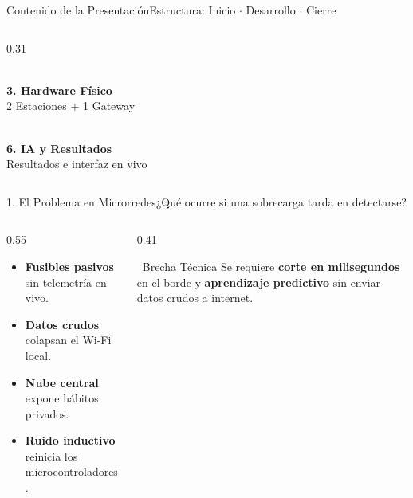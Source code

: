 \documentclass[aspectratio=169,11pt,xcolor=table]{beamer}
\begin{document}
\begin{frame}{Contenido de la Presentación}{Estructura: Inicio $\cdot$ Desarrollo $\cdot$ Cierre}
\begin{columns}[T,onlytextwidth]
    \begin{column}{0.31\textwidth}
      \begin{tcolorbox}[colback=brandamber!12,colframe=brandamber!50,boxrule=0.7pt,arc=4pt,halign=center,top=4pt,bottom=4pt,boxsep=1pt]
        {\large\color{brandamber}\faServer}\\[2pt]
        {\small\bfseries 3. Hardware Físico}\\[1pt]
        {\scriptsize 2 Estaciones + 1 Gateway}
      \end{tcolorbox}
      \vspace{0.12cm}
      \begin{tcolorbox}[colback=brandblue!10,colframe=brandblue!40,boxrule=0.7pt,arc=4pt,halign=center,top=4pt,bottom=4pt,boxsep=1pt]
        {\large\color{brandblue}\faBrain}\\[2pt]
        {\small\bfseries 6. IA y Resultados}\\[1pt]
        {\scriptsize Resultados e interfaz en vivo}
      \end{tcolorbox}
    \end{column}
  \end{columns}
\end{frame}

\begin{frame}{1. El Problema en Microrredes}{¿Qué ocurre si una sobrecarga tarda en detectarse?}
  \vspace{0.15cm}
  \begin{columns}[c,onlytextwidth]
    \begin{column}{0.55\textwidth}
      \normalsize
      \begin{itemize}\setlength{\itemsep}{10pt}
        \item \textbf{Fusibles pasivos} sin telemetría en vivo.
        \item \textbf{Datos crudos} colapsan el Wi-Fi local.
        \item \textbf{Nube central} expone hábitos privados.
        \item \textbf{Ruido inductivo} reinicia los microcontroladores.
      \end{itemize}
    \end{column}
    \begin{column}{0.41\textwidth}
      \begin{softcard}[brandamber]{\faLightbulb\ Brecha Técnica}
        \small
        Se requiere \textbf{corte en milisegundos} en el borde y \textbf{aprendizaje predictivo} sin enviar datos crudos a internet.
      \end{softcard}
    \end{column}
  \end{columns}
\end{frame}
\end{document}
